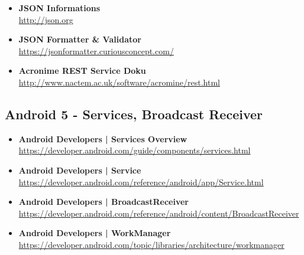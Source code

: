 \documentclass[a4paper]{article}
\begin{document}
\begin{itemize}
			\item \textbf{JSON Informations}\\
			\href{http://json.org}
			{http://json.org}
			
			\item \textbf{JSON Formatter \& Validator}\\
			\href{https://jsonformatter.curiousconcept.com/}
			{https://jsonformatter.curiousconcept.com/}
			
			\item \textbf{Acronime REST Service Doku}\\
			\href{http://www.nactem.ac.uk/software/acromine/rest.html}
			{http://www.nactem.ac.uk/software/acromine/rest.html}
			
		\end{itemize}
	
		\subsection{Android 5 - Services, Broadcast Receiver}
		
		\begin{itemize}
			
			\item \textbf{Android Developers | Services Overview}\\
			\href{https://developer.android.com/guide/components/services.html}
			{https://developer.android.com/guide/components/services.html}
			
			\item \textbf{Android Developers | Service}\\
			\href{https://developer.android.com/reference/android/app/Service.html}
			{https://developer.android.com/reference/android/app/Service.html}		
				
			\item \textbf{Android Developers | BroadcastReceiver}\\
			\href{https://developer.android.com/reference/android/content/BroadcastReceiver}
			{https://developer.android.com/reference/android/content/BroadcastReceiver}	
			
			\item \textbf{Android Developers | WorkManager}\\
			\href{https://developer.android.com/topic/libraries/architecture/workmanager}
			{https://developer.android.com/topic/libraries/architecture/workmanager}			
			
		\end{itemize}
	
\end{document}

